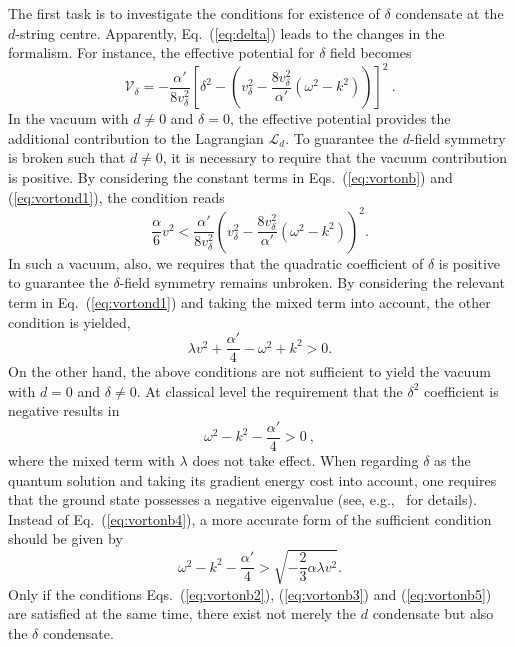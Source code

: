 \documentclass[12pt]{article}
\begin{document}
The first task is to investigate the conditions for existence of $\delta$ condensate at the $d$-string centre.
Apparently, Eq.~(\ref{eq:delta}) leads to the changes in the formalism.
For instance, the effective potential for $\delta$ field becomes
\begin{equation}    \label{eq:vortond1}
  \mathcal{V}_\delta= -\frac{\alpha'}{8v_\delta^2} [\delta^2 - (v_\delta^2 - \frac{8v_\delta^2}{\alpha'}(\omega^2 -k^2))]^2 \ .\end{equation}
In the vacuum with $d \neq 0$ and $\delta = 0$, the effective potential provides the additional
contribution to the Lagrangian $\mathcal{L}_d$. To guarantee the $d$-field symmetry is broken such
that $d \neq 0$, it is necessary to require that the vacuum contribution is positive.
By considering the constant terms in Eqs.~(\ref{eq:vortonb}) and (\ref{eq:vortond1}), the condition reads
\begin{equation}
\label{eq:vortonb2}
  \frac{\alpha}{6} v^2 < \frac{\alpha'}{8v_\delta^2}(v_\delta^2  - \frac{8v_\delta^2}{\alpha'}(\omega^2 -k^2))^2.
\end{equation}
In such a vacuum, also, we requires that the quadratic
coefficient of $\delta$ is positive to guarantee the
$\delta$-field symmetry remains unbroken.
By considering the relevant term in Eq.~(\ref{eq:vortond1}) and taking the mixed
term into account, the other condition is yielded,
\begin{equation}
  \label{eq:vortonb3}
  \lambda v^2 + \frac{\alpha'}{4}- \omega^2 +k^2 > 0.
\end{equation}
On the other hand, the above conditions are not sufficient to yield the vacuum
with $d = 0$ and $\delta \neq 0$.
At classical level the requirement that the $\delta^2$ coefficient is negative results in
\begin{equation}
  \label{eq:vortonb4}
\omega^2 - k^2 -\frac{\alpha'}{4} > 0 \ ,
\end{equation}
where the mixed term with $\lambda$ does not take effect. When regarding $\delta$ as
the quantum solution and taking its gradient energy cost into account, one requires that the
ground state possesses a negative eigenvalue (see, e.g.,~\cite{vilenkin2000cosmic,haws1988superconducting}
for details).
Instead of Eq.~(\ref{eq:vortonb4}), a more accurate form of the sufficient condition should be given by
\begin{equation}
  \label{eq:vortonb5}
  \omega^2 - k^2 -\frac{\alpha'}{4} > \sqrt{- \frac{2}{3}\alpha \lambda v^2}.
\end{equation}
Only if the conditions Eqs.~(\ref{eq:vortonb2}), (\ref{eq:vortonb3}) and (\ref{eq:vortonb5}) are
satisfied at the same time, there exist not merely the $d$ condensate but also the $\delta$ condensate.
\end{document}

